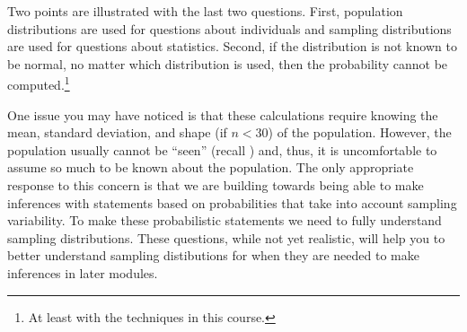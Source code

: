 \documentclass[10pt,openany]{book}\usepackage[]{graphicx}\usepackage[]{color}
\begin{document}
Two points are illustrated with the last two questions.  First, population distributions are used for questions about individuals and sampling distributions are used for questions about statistics.  Second, if the distribution is not known to be normal, no matter which distribution is used, then the probability cannot be computed.\footnote{At least with the techniques in this course.}


\vspace{-12pt}

One issue you may have noticed is that these calculations require knowing the mean, standard deviation, and shape (if $n<30$) of the population.  However, the population usually cannot be ``seen'' (recall ) and, thus, it is uncomfortable to assume so much to be known about the population.  The only appropriate response to this concern is that we are building towards being able to make inferences with statements based on probabilities that take into account sampling variability.  To make these probabilistic statements we need to fully understand sampling distributions.  These questions, while not yet realistic, will help you to better understand sampling distibutions for when they are needed to make inferences in later modules.
\end{document}
